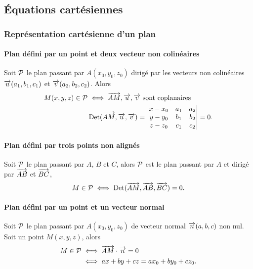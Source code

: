 \subsection{Équations cartésiennes}

\subsubsection{Représentation cartésienne d'un plan}

\paragraph{Plan défini par un point et deux vecteur non colinéaires}

Soit \(\P\) le plan passant par \(A(x_0, y_0, z_0)\) dirigé par les vecteurs 
non colinéaires \(\vu(a_1, b_1, c_1)\) et \(\vv(a_2, b_2, c_2)\). Alors
\begin{align}
  M(x, y, z) \in \P &\iff \vect{AM}, \vu, \vv \text{~sont coplanaires}\\
                    &\Det(\vect{AM},\vu, \vv) = \begin{vmatrix} x - x_0 & a_1 
                      & a_2 \\ y - y_0 & b_1 & b_2 \\ z - z_0 & c_1 & c_2
                    \end{vmatrix} = 0.
\end{align}

\paragraph{Plan défini par trois points non alignés}

Soit \(\P\) le plan passant par \(A\), \(B\) et \(C\), alors \(\P\) est le 
plan passant par \(A\) et dirigé par \(\vect{AB}\) et \(\vect{BC}\),
\begin{equation}
  M \in \P \iff \Det(\vect{AM}, \vect{AB}, \vect{BC}) = 0.
\end{equation}

\paragraph{Plan défini par un point et un vecteur normal}

Soit \(\P\) le plan passant par \(A(x_0, y_0, z_0)\) de vecteur normal 
\(\vect{n}(a, b, c)\) non nul. Soit un point \(M(x, y, z)\), alors
\begin{align}
  M \in \P &\iff \vect{AM}\cdot\vect{n} = 0 \\
           &\iff ax + by + cz = ax_0 + by_0 + cz_0.
\end{align}

